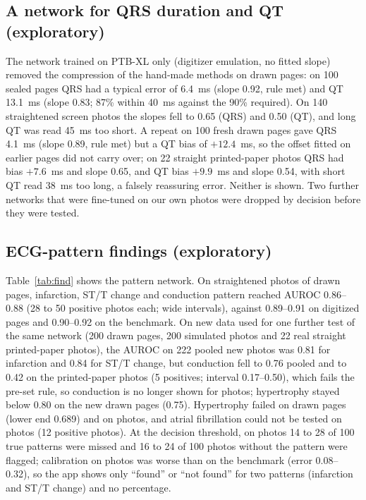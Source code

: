 \documentclass[conference]{IEEEtran}
\begin{document}
\subsection{A network for QRS duration and QT (exploratory)}
The network trained on PTB-XL only (digitizer emulation, no fitted slope) removed the compression of the hand-made methods on drawn pages: on 100 sealed pages QRS had a typical error of 6.4~ms (slope 0.92, rule met) and QT 13.1~ms (slope 0.83; 87\% within 40~ms against the 90\% required). On 140 straightened screen photos the slopes fell to 0.65 (QRS) and 0.50 (QT), and long QT was read 45~ms too short. A repeat on 100 fresh drawn pages gave QRS 4.1~ms (slope 0.89, rule met) but a QT bias of $+12.4$~ms, so the offset fitted on earlier pages did not carry over; on 22 straight printed-paper photos QRS had bias $+7.6$~ms and slope 0.65, and QT bias $+9.9$~ms and slope 0.54, with short QT read 38~ms too long, a falsely reassuring error. Neither is shown. Two further networks that were fine-tuned on our own photos were dropped by decision before they were tested.

\subsection{ECG-pattern findings (exploratory)}
Table~\ref{tab:find} shows the pattern network. On straightened photos of drawn pages, infarction, ST/T change and conduction pattern reached AUROC 0.86--0.88 (28 to 50 positive photos each; wide intervals), against 0.89--0.91 on digitized pages and 0.90--0.92 on the benchmark. On new data used for one further test of the same network (200 drawn pages, 200 simulated photos and 22 real straight printed-paper photos), the AUROC on 222 pooled new photos was 0.81 for infarction and 0.84 for ST/T change, but conduction fell to 0.76 pooled and to 0.42 on the printed-paper photos (5 positives; interval 0.17--0.50), which fails the pre-set rule, so conduction is no longer shown for photos; hypertrophy stayed below 0.80 on the new drawn pages (0.75).  Hypertrophy failed on drawn pages (lower end 0.689) and on photos, and atrial fibrillation could not be tested on photos (12 positive photos). At the decision threshold, on photos 14 to 28 of 100 true patterns were missed and 16 to 24 of 100 photos without the pattern were flagged; calibration on photos was worse than on the benchmark (error 0.08--0.32), so the app shows only ``found'' or ``not found'' for two patterns (infarction and ST/T change) and no percentage.
\end{document}
